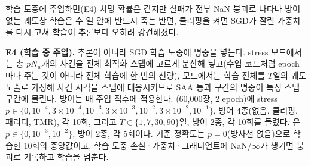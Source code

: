 %
%

학습 도중에 주입하면(E4) 치명 확률은 같지만 실패가 전부 NaN 붕괴로 나타나 방어 없는 궤도상 학습은 수 일 안에 반드시 죽는 반면, 클리핑을 켜면 SGD가 잘린 가중치를 다시 고쳐 학습이 추론보다 오히려 강건해졌다.

\textbf{E4 (학습 중 주입).} 추론이 아니라 SGD 학습 도중에 명중을 넣는다. stress 모드에서는 총 $pN_w$개의 사건을 전체 최적화 스텝에 고르게 분산해 넣고(수업 코드처럼 epoch마다 주는 것이 아니라 전체 학습에 한 번의 선량),  모드에서는 학습 전체를 $T$일의 궤도 노출로 가정해 사건 시각을 스텝에 대응시키므로 SAA 통과 구간의 명중이 특정 스텝 구간에 몰린다. 방어는 매 주입 직후에 적용한다. (60{,}000장, 2 epoch)에 stress $p\in\{0,10^{-4},3\times10^{-4},10^{-3},3\times10^{-3},10^{-2},3\times10^{-2},10^{-1}\}$, 방어 4종(없음, 클리핑, 패리티, TMR), 각 10회, 그리고  $T\in\{1,7,30,90\}$일, 방어 2종, 각 10회를 돌렸다. 은 $p\in\{0,10^{-3},10^{-2}\}$, 방어 2종, 각 5회이다. 기준 정확도는 $p=0$(방사선 없음)으로 학습한 10회의 중앙값이고, 학습 도중 손실·가중치·그래디언트에 NaN/$\infty$가 생기면 붕괴로 기록하고 학습을 멈춘다.

